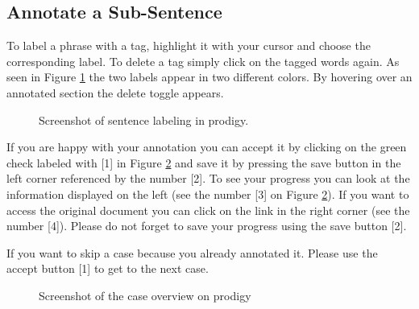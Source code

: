 \documentclass{article}
\begin{document}
\subsection{Annotate a Sub-Sentence}
To label a phrase with a tag, highlight it with your cursor and choose the corresponding label. To delete a tag simply click on the tagged words again. As seen in Figure \ref{sentence_annotation} the two labels appear in two different colors. By hovering over an annotated section the delete toggle appears.

\begin{figure}[H]
     \caption{Screenshot of sentence labeling in prodigy.}
     \label{sentence_annotation}
\end{figure}


If you are happy with your annotation you can accept it by clicking on the green check labeled with [1] in Figure \ref{overview} and save it by pressing the save button in the left corner referenced by the number [2].
To see your progress you can look at the information displayed on the left (see the number [3] on Figure \ref{overview}). If you want to access the original document you can click on the link in the right corner (see the number [4]). Please do not forget to save your progress using the save button [2].

If you want to skip a case because you already annotated it. Please use the accept button [1] to get to the next case.
\pagebreak
\begin{figure}[h]
     \caption{Screenshot of the case overview on prodigy}
     \label{overview}
\end{figure}
\end{document}

